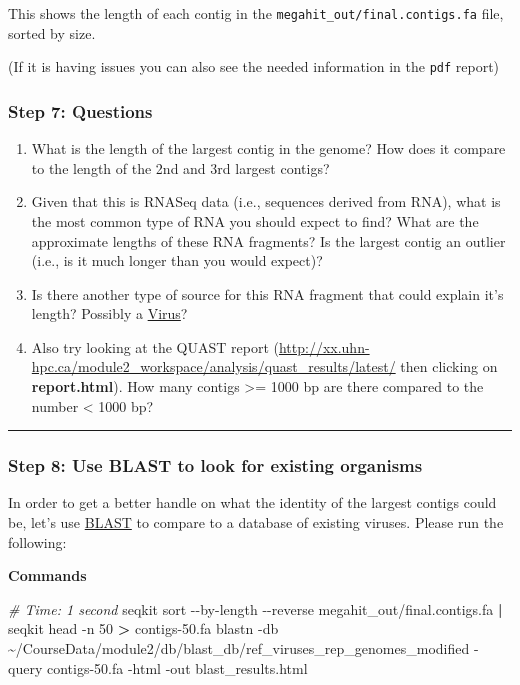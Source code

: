 \documentclass[
]{book}
\newenvironment{Shaded}{\begin{snugshade}}{\end{snugshade}}
\newcommand{\AttributeTok}[1]{\textcolor[rgb]{0.13,0.29,0.53}{#1}}
\newcommand{\CommentTok}[1]{\textcolor[rgb]{0.56,0.35,0.01}{\textit{#1}}}
\newcommand{\ExtensionTok}[1]{#1}
\newcommand{\KeywordTok}[1]{\textcolor[rgb]{0.13,0.29,0.53}{\textbf{#1}}}
\newcommand{\NormalTok}[1]{#1}
\newcommand{\OperatorTok}[1]{\textcolor[rgb]{0.81,0.36,0.00}{\textbf{#1}}}
\providecommand{\tightlist}{%
  \setlength{\itemsep}{0pt}\setlength{\parskip}{0pt}}
\begin{document}
This shows the length of each contig in the \texttt{megahit\_out/final.contigs.fa} file, sorted by size.

(If it is having issues you can also see the needed information in the \texttt{pdf} report)

\subsubsection{Step 7: Questions}\label{step-7-questions}

\begin{enumerate}
\def\labelenumi{\arabic{enumi}.}
\tightlist
\item
  What is the length of the largest contig in the genome? How does it compare to the length of the 2nd and 3rd largest contigs?
\item
  Given that this is RNASeq data (i.e., sequences derived from RNA), what is the most common type of RNA you should expect to find? What are the approximate lengths of these RNA fragments? Is the largest contig an outlier (i.e., is it much longer than you would expect)?
\item
  Is there another type of source for this RNA fragment that could explain it's length? Possibly a \href{https://en.wikipedia.org/wiki/Coronavirus\#Genome}{Virus}?
\item
  Also try looking at the QUAST report (\url{http://xx.uhn-hpc.ca/module2_workspace/analysis/quast_results/latest/} then clicking on \textbf{report.html}). How many contigs \textgreater= 1000 bp are there compared to the number \textless{} 1000 bp?
\end{enumerate}

\begin{center}\rule{0.5\linewidth}{0.5pt}\end{center}

\subsubsection{Step 8: Use BLAST to look for existing organisms}\label{exercise-blast}

In order to get a better handle on what the identity of the largest contigs could be, let's use \href{https://blast.ncbi.nlm.nih.gov/Blast.cgi}{BLAST} to compare to a database of existing viruses. Please run the following:

\textbf{Commands}

\begin{Shaded}
\begin{Highlighting}[]
\CommentTok{\# Time: 1 second}
\ExtensionTok{seqkit}\NormalTok{ sort }\AttributeTok{{-}{-}by{-}length} \AttributeTok{{-}{-}reverse}\NormalTok{ megahit\_out/final.contigs.fa }\KeywordTok{|} \ExtensionTok{seqkit}\NormalTok{ head }\AttributeTok{{-}n}\NormalTok{ 50 }\OperatorTok{\textgreater{}}\NormalTok{ contigs{-}50.fa}
\ExtensionTok{blastn} \AttributeTok{{-}db}\NormalTok{ \textasciitilde{}/CourseData/module2/db/blast\_db/ref\_viruses\_rep\_genomes\_modified }\AttributeTok{{-}query}\NormalTok{ contigs{-}50.fa }\AttributeTok{{-}html} \AttributeTok{{-}out}\NormalTok{ blast\_results.html}
\end{Highlighting}
\end{Shaded}
\end{document}
